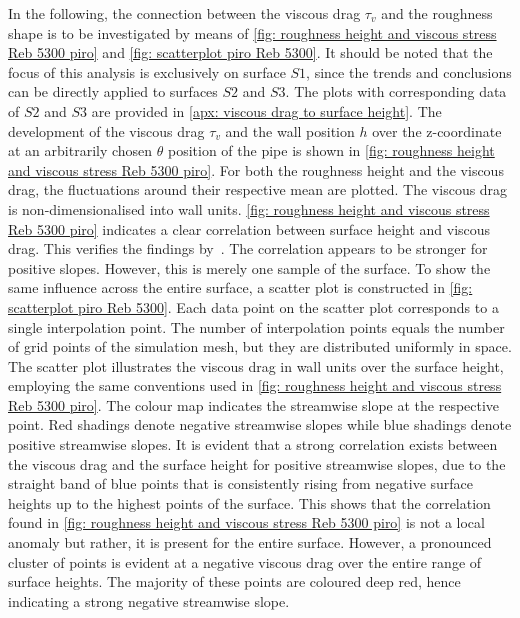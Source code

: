 In the following, the connection between the viscous drag $\tau_v$ and the roughness shape is to be investigated by means of \autoref{fig: roughness height and viscous stress Reb 5300 piro} and \autoref{fig: scatterplot piro Reb 5300}.
It should be noted that the focus of this analysis is exclusively on surface $S1$, since the trends and conclusions can be directly applied to surfaces $S2$ and $S3$.
The plots with corresponding data of $S2$ and $S3$ are provided in \autoref{apx: viscous drag to surface height}.
The development of the viscous drag $\tau_v$ and the wall position $h$ over the z-coordinate at an arbitrarily chosen $\theta$ position of the pipe is shown in \autoref{fig: roughness height and viscous stress Reb 5300 piro}.
For both the roughness height and the viscous drag, the fluctuations around their respective mean are plotted.
The viscous drag is non-dimensionalised into wall units.
\autoref{fig: roughness height and viscous stress Reb 5300 piro} indicates a clear correlation between  surface height and viscous drag.
This verifies the findings by~\cite{maDirectNumericalSimulation2021}.
The correlation appears to be stronger for positive slopes.
However, this is merely one sample of the surface.
To show the same influence across the entire surface, a scatter plot is constructed in \autoref{fig: scatterplot piro Reb 5300}.
Each data point on the scatter plot corresponds to a single interpolation point.
The number of interpolation points equals the number of grid points of the simulation mesh, but they are distributed uniformly in space.
The scatter plot illustrates the viscous drag in wall units over the surface height, employing the same conventions used in \autoref{fig: roughness height and viscous stress Reb 5300 piro}.
The colour map indicates the streamwise slope at the respective point.
Red shadings denote negative streamwise slopes while blue shadings denote positive streamwise slopes.
It is evident that a strong correlation exists between the viscous drag and the surface height for positive streamwise slopes, due to the straight band of blue points that is consistently rising from negative surface heights up to the highest points of the surface.
This shows that the correlation found in \autoref{fig: roughness height and viscous stress Reb 5300 piro} is not a local anomaly but rather, it is present for the entire surface.
However, a pronounced cluster of points is evident at a negative viscous drag over the entire range of surface heights.
The majority of these points are coloured deep red, hence indicating a strong negative streamwise slope.
